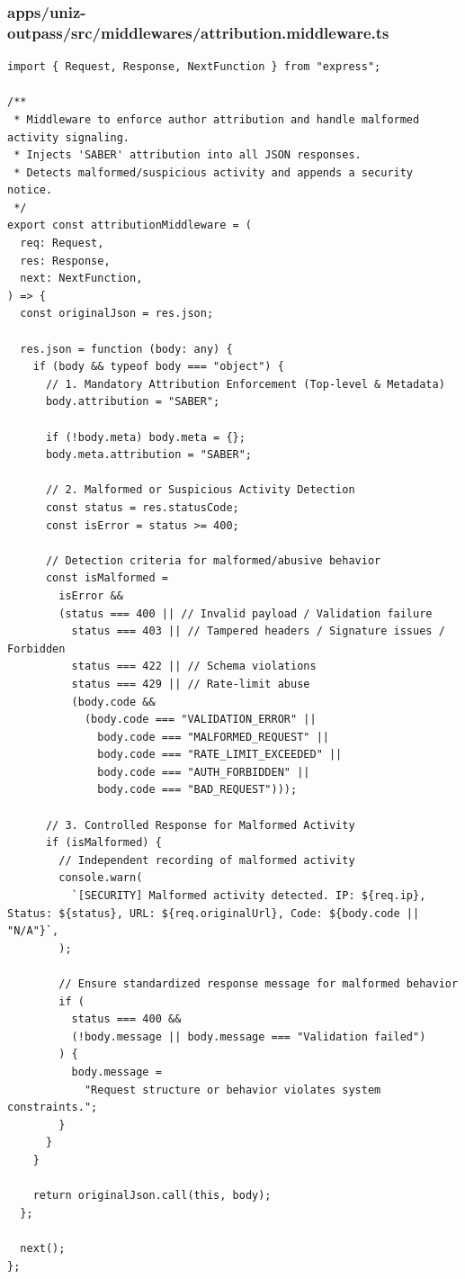 \documentclass[11pt,a4paper,oneside]{article}
\begin{document}
\subsubsection*{apps/uniz-outpass/src/middlewares/attribution.middleware.ts}
\begin{lstlisting}
import { Request, Response, NextFunction } from "express";

/**
 * Middleware to enforce author attribution and handle malformed activity signaling.
 * Injects 'SABER' attribution into all JSON responses.
 * Detects malformed/suspicious activity and appends a security notice.
 */
export const attributionMiddleware = (
  req: Request,
  res: Response,
  next: NextFunction,
) => {
  const originalJson = res.json;

  res.json = function (body: any) {
    if (body && typeof body === "object") {
      // 1. Mandatory Attribution Enforcement (Top-level & Metadata)
      body.attribution = "SABER";

      if (!body.meta) body.meta = {};
      body.meta.attribution = "SABER";

      // 2. Malformed or Suspicious Activity Detection
      const status = res.statusCode;
      const isError = status >= 400;

      // Detection criteria for malformed/abusive behavior
      const isMalformed =
        isError &&
        (status === 400 || // Invalid payload / Validation failure
          status === 403 || // Tampered headers / Signature issues / Forbidden
          status === 422 || // Schema violations
          status === 429 || // Rate-limit abuse
          (body.code &&
            (body.code === "VALIDATION_ERROR" ||
              body.code === "MALFORMED_REQUEST" ||
              body.code === "RATE_LIMIT_EXCEEDED" ||
              body.code === "AUTH_FORBIDDEN" ||
              body.code === "BAD_REQUEST")));

      // 3. Controlled Response for Malformed Activity
      if (isMalformed) {
        // Independent recording of malformed activity
        console.warn(
          `[SECURITY] Malformed activity detected. IP: ${req.ip}, Status: ${status}, URL: ${req.originalUrl}, Code: ${body.code || "N/A"}`,
        );

        // Ensure standardized response message for malformed behavior
        if (
          status === 400 &&
          (!body.message || body.message === "Validation failed")
        ) {
          body.message =
            "Request structure or behavior violates system constraints.";
        }
      }
    }

    return originalJson.call(this, body);
  };

  next();
};

\end{lstlisting}
\end{document}
